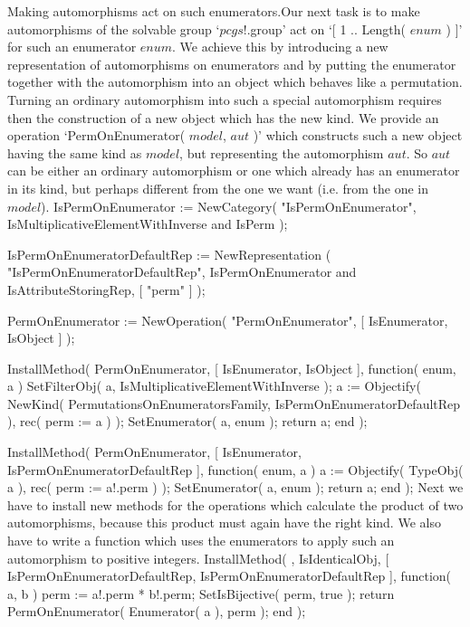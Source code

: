 {\bsf  Making automorphisms act  on such enumerators.}\quad Our next task
is to make automorphisms of the  solvable group `$pcgs$!.group' act on `[
1 .. Length( $enum$ )  ]' for such an  enumerator $enum$. We achieve this
by  introducing a new  representation of automorphisms on enumerators and
by putting the enumerator together  with the automorphism into an  object
which behaves like  a permutation. Turning  an ordinary automorphism into
such  a special  automorphism requires  then   the construction of  a new
object which has the new kind. We provide an operation `PermOnEnumerator(
$model$, $aut$ )' which constructs such a new object having the same kind
as  $model$,  but representing the  automorphism  $aut$. So $aut$  can be
either an ordinary automorphism or one which already has an enumerator in
its kind, but perhaps  different from the one  we want (i.e. from the one
in $model$).
\begintt
IsPermOnEnumerator := NewCategory( "IsPermOnEnumerator",
    IsMultiplicativeElementWithInverse and IsPerm );
\endtt

\begintt
IsPermOnEnumeratorDefaultRep := NewRepresentation
    ( "IsPermOnEnumeratorDefaultRep",
      IsPermOnEnumerator and IsAttributeStoringRep,
      [ "perm" ] );

PermOnEnumerator := NewOperation( "PermOnEnumerator",
    [ IsEnumerator, IsObject ] );
\endtt

\begintt
InstallMethod( PermOnEnumerator,
        [ IsEnumerator, IsObject ],
    function( enum, a )
    SetFilterObj( a, IsMultiplicativeElementWithInverse );
    a := Objectify( NewKind( PermutationsOnEnumeratorsFamily,
                 IsPermOnEnumeratorDefaultRep ),
                 rec( perm := a ) );
    SetEnumerator( a, enum );
    return a;
end );
\endtt

\begintt
InstallMethod( PermOnEnumerator,
        [ IsEnumerator, IsPermOnEnumeratorDefaultRep ],
    function( enum, a )
    a := Objectify( TypeObj( a ), rec( perm := a!.perm ) );
    SetEnumerator( a, enum );
    return a;
end );
\endtt
Next we  have to install new  methods for the  operations which calculate
the  product of two automorphisms, because   this product must again have
the    right kind. We    also have to write  a    function which uses the
enumerators to apply such an automorphism to positive integers.
\begintt
InstallMethod( \*, IsIdenticalObj,
        [ IsPermOnEnumeratorDefaultRep, IsPermOnEnumeratorDefaultRep ],
    function( a, b )
    perm := a!.perm * b!.perm;
    SetIsBijective( perm, true );
    return PermOnEnumerator( Enumerator( a ), perm );
end );
\endtt

